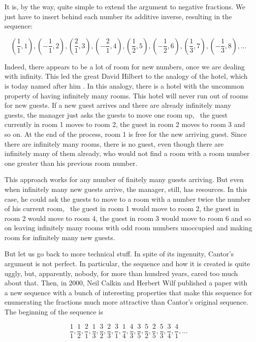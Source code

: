\documentclass[tikz]{scrreprt}
\begin{document}
It is, by the way, quite simple
to extend the argument to negative fractions.
We just have to insert behind each number
its additive inverse, resulting in
the sequence:

\[
 \left(\frac{1}{1},1\right),
 \left(-\frac{1}{1},2\right),
 \left(\frac{2}{1},3\right), 
 \left(-\frac{2}{1},4\right), 
 \left(\frac{1}{2},5\right), 
 \left(-\frac{1}{2},6\right), 
 \left(\frac{1}{3},7\right), 
 \left(-\frac{1}{3},8\right), 
 \dots
\]

Indeed, there appears to be a lot of room
for new numbers, once we are dealing with
infinity.
This led the great David Hilbert to the
analogy of the hotel, which is today 
named after him .
In this analogy, there is a hotel with the
uncommon property of having infinitely
many rooms. This hotel will never run
out of rooms for new guests.
If a new guest arrives and there are
already infinitely many guests,
the manager just asks the guests
to move one room up, \ie\ the guest
currently in room 1 moves to room 2,
the guest in room 2 moves to room 3
and so on. 
At the end of the process,
room 1 is free for the new arriving guest.
Since there are infinitely
many rooms, there is no guest,
even though there are infinitely many of them already,
who would not find a room with a room number
one greater than his previous room number.

This approach works for any number of finitely many
guests arriving.
But even when infinitely many new guests arrive,
the manager, still, has resources.
In this case, he could ask the guests to move to
a room with a number twice the number of his
current room, \eg\ the guest in room 1
would move to room 2, the guest in room 2
would move to room 4, the guest in room 3
would move to room 6 and so on
leaving infinitely many rooms
with odd room numbers unoccupied
and making room for infinitely many new guests.

But let us go back to more technical stuff.
In spite of its ingenuity, Cantor's argument
is not perfect.
In particular, the sequence and how it is
created is quite uggly,
but, apparently, nobody, for more than hundred years,
cared too much about that. 
Then, in \num{2000}, Neil Calkin and Herbert Wilf
published a paper with a new sequence with 
a bunch of interesting properties that make
this sequence for enumerating the fractions
much more attractive than Cantor's original
sequence. The beginning of the sequence is

\[
 \frac{1}{1},
 \frac{1}{2}, 
 \frac{2}{1}, 
 \frac{1}{3}, 
 \frac{3}{2}, 
 \frac{2}{3}, 
 \frac{3}{1}, 
 \frac{1}{4}, 
 \frac{4}{3}, 
 \frac{3}{5}, 
 \frac{5}{2},
 \frac{2}{5},
 \frac{5}{3},
 \frac{3}{4},
 \frac{4}{1},
 \dots
\]
\end{document}
